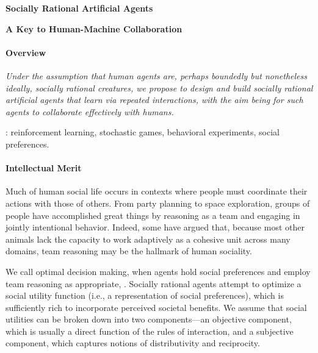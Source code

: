 
\centerline{\Large \bf Socially Rational Artificial Agents}

\vspace{\down}
\centerline{\large \bf A Key to Human-Machine Collaboration}

\vspace{\up}
\paragraph{Overview}

\emph{Under the assumption that human agents are, perhaps boundedly
  but nonetheless ideally, socially rational creatures, we propose to
  design and build socially rational artificial agents that learn via
  repeated interactions, with the aim being for such agents to
  collaborate effectively with humans.}



: reinforcement learning, stochastic games, behavioral experiments, social preferences.

\vspace{\up}
\paragraph{Intellectual Merit}

Much of human social life occurs in contexts where people must
coordinate their actions with those of others.  From party planning to
space exploration,
groups of people have
accomplished great things by reasoning as a team and engaging in
jointly intentional behavior.  Indeed, some have argued that, because
most other animals lack the capacity to work adaptively as a cohesive
unit across many domains, team reasoning may be the hallmark of human
sociality.

We call optimal decision making, when agents hold social preferences
and employ team reasoning as appropriate, .  
Socially
rational agents attempt to optimize a social utility function (i.e., a
representation of social preferences), which is sufficiently rich to
incorporate perceived societal
benefits.  We assume that social utilities can be broken down into two
components---an objective component, which is usually a direct
function of the rules of interaction, and a subjective component,
which captures notions of distributivity and reciprocity.

